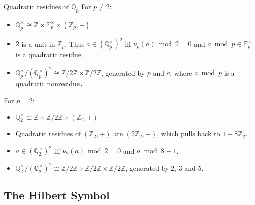 \documentclass[fontset=fandol,envcountsect]{ctexbeamer}
\theoremstyle{theorem}
\theoremstyle{example}
\theoremstyle{remark}
\theoremstyle{theorem}
\theoremstyle{example}
\theoremstyle{remark}
\begin{document}
\begin{frame}{Quadratic residues of \(\mathbb Q_p\)}
\label{quadratic-residues-of-mathbb-q_p}
For \(p \neq 2\):

\begin{itemize}
\item
  \(\mathbb Q_p^\times \cong \mathbb Z \times \mathbb F_p^\times \times (\mathbb Z_p, +)\)
\item
  \(2\) is a unit in \(\mathbb Z_p\). Thus
  \(a \in (\mathbb Q_p^\times)^2\) iff \(\nu_p(a) \bmod 2 = 0\) and
  \(a \bmod p \in \mathbb F_p^\times\) is a quadratic residue.
\item
  \(\mathbb Q_p^\times / (\mathbb Q_p^\times)^2 \cong \mathbb Z / 2\mathbb Z \times \mathbb Z / 2\mathbb Z\),
  generated by \(p\) and \(a\), where \(a \bmod p\) is a quadratic
  nonresidue．
\end{itemize}

For \(p = 2\):

\begin{itemize}
\item
  \(\mathbb Q_2^\times \cong \mathbb Z \times \mathbb Z / 2 \mathbb Z \times (\mathbb Z_2, +)\)
\item
  Quadratic residues of \((\mathbb Z_2, +)\) are \((2 \mathbb Z_2, +)\),
  which pulls back to \(1 + 8 \mathbb Z_2\).
\item
  \(a \in (\mathbb Q_2^\times)^2\) iff \(\nu_2(a) \bmod 2 = 0\) and
  \(a \bmod 8 \equiv 1\).
\item
  \(\mathbb Q_2^\times / (\mathbb Q_2^\times)^2 \cong \mathbb Z / 2\mathbb Z \times \mathbb Z / 2\mathbb Z \times \mathbb Z / 2\mathbb Z\),
  generated by \(2\), \(3\) and \(5\).
\end{itemize}
\end{frame}

\subsection{The Hilbert Symbol}\label{the-hilbert-symbol}

\end{document}
